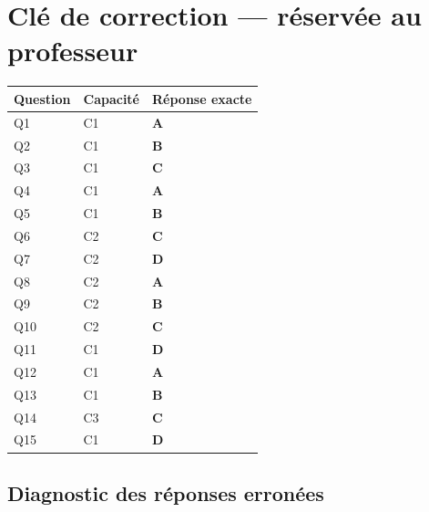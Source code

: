 \ifnxVersionProfesseur
\clearpage
\section*{Clé de correction — réservée au professeur}

\begin{center}
\begin{tabular}{lll}
\hline
Question & Capacité & Réponse exacte \\
\hline
Q1 & C1 & \textbf{A} \\
Q2 & C1 & \textbf{B} \\
Q3 & C1 & \textbf{C} \\
Q4 & C1 & \textbf{A} \\
Q5 & C1 & \textbf{B} \\
Q6 & C2 & \textbf{C} \\
Q7 & C2 & \textbf{D} \\
Q8 & C2 & \textbf{A} \\
Q9 & C2 & \textbf{B} \\
Q10 & C2 & \textbf{C} \\
Q11 & C1 & \textbf{D} \\
Q12 & C1 & \textbf{A} \\
Q13 & C1 & \textbf{B} \\
Q14 & C3 & \textbf{C} \\
Q15 & C1 & \textbf{D} \\
\hline
\end{tabular}
\end{center}

\subsection*{Diagnostic des réponses erronées}

